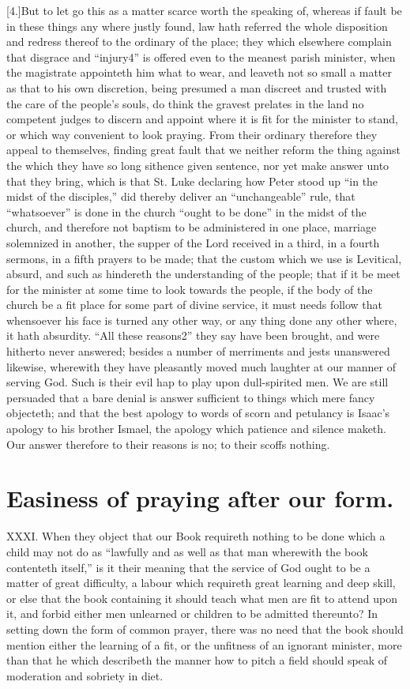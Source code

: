 [4.]But to let go this as a matter scarce worth the speaking of, whereas if fault be in these things any where justly found, law hath referred the whole disposition and redress thereof to the ordinary of the place; they which elsewhere complain that disgrace and “injury4” is offered even to the meanest parish minister, when the magistrate appointeth him what to wear, and leaveth not so small a matter as that to his own discretion, being presumed a man discreet and trusted with the care of the people’s souls, do think the gravest prelates in the land no competent judges to discern and appoint where it is fit for the minister to stand, or which way convenient to look praying. From their ordinary therefore they appeal  to themselves, finding great fault that we neither reform the thing against the which they have so long sithence given sentence, nor yet make answer unto that they bring, which is that St. Luke declaring how Peter stood up “in the midst of the disciples,” did thereby deliver an “unchangeable” rule, that “whatsoever” is done in the church “ought to be  done” in the midst of the church,
 and therefore not baptism to be administered in one place, marriage solemnized in another, the supper of the Lord received in a third, in a fourth sermons, in a fifth prayers to be made; that the custom which we use is Levitical, absurd, and such as hindereth the understanding of the people; that if it be meet for the minister at some time to look towards the people, if the body of the church be a fit place for some part of divine service, it must needs follow that whensoever his face is turned any other way, or any thing done any other where, it hath absurdity. “All these reasons2” they say have been brought, and were hitherto never answered; besides a number of merriments and jests unanswered likewise, wherewith they have pleasantly moved much laughter at our manner of serving God. Such is their evil hap to play upon dull-spirited men. We are still persuaded that a bare denial is answer sufficient to things which mere fancy objecteth; and that the best apology to words of scorn and petulancy is Isaac’s apology to his brother Ismael, the apology which patience and silence maketh. Our answer therefore to their reasons is no; to their scoffs nothing.


\section*{Easiness of praying after our form.}
XXXI. When they object that our Book requireth nothing to be done which a child may not do as “lawfully and as well as that man wherewith the book contenteth itself,” is it their meaning that the service of God ought to be a matter of great difficulty, a labour which requireth great learning and  deep skill, or else that the book containing it should teach what men are fit to attend upon it, and forbid either men unlearned or children to be admitted thereunto?
 In setting down the form of common prayer, there was no need that the book should mention either the learning of a fit, or the unfitness of an ignorant minister, more than that he which describeth the manner how to pitch a field should speak of moderation and sobriety in diet.

